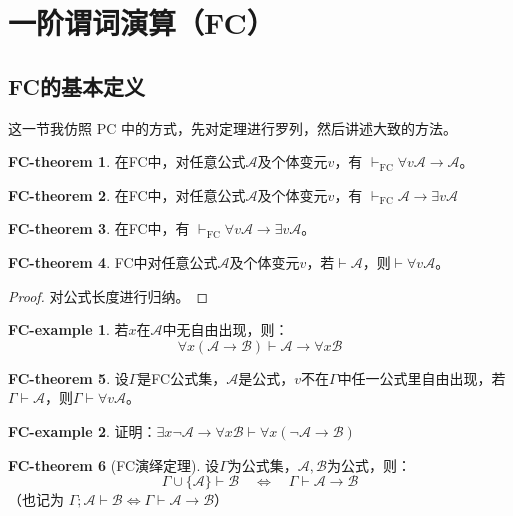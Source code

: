 \documentclass[oneside]{book}
\theoremstyle{definition}
\newtheorem{fct}{FC-theorem}
\newtheorem{fce}{FC-example}
\begin{document}
\section{一阶谓词演算（FC）}




\subsection{FC的基本定义}
这一节我仿照 PC 中的方式，先对定理进行罗列，然后讲述大致的方法。
\begin{fct}
	在FC中，对任意公式\( \mathcal{A} \)及个体变元\( v \)，有 \( \vdash_{\text{FC}} \forall v \mathcal{A} \to \mathcal{A} \)。
\end{fct}
\begin{fct}
	在FC中，对任意公式\( \mathcal{A} \)及个体变元\( v \)，有 \( \vdash_{\text{FC}} \mathcal{A} \to \exists v \mathcal{A} \)
\end{fct}
\begin{fct}
	在FC中，有 \( \vdash_{\text{FC}} \forall v \mathcal{A} \to \exists v \mathcal{A} \)。
\end{fct}
\begin{fct}
	FC中对任意公式\( \mathcal{A} \)及个体变元\( v \)，若\( \vdash \mathcal{A} \)，则\( \vdash \forall v \mathcal{A} \)。
\end{fct}
\begin{proof}
	对公式长度进行归纳。
\end{proof}
\begin{fce}
若\( x \)在\( \mathcal{A} \)中无自由出现，则：
\[
\forall x (\mathcal{A} \to \mathcal{B}) \vdash \mathcal{A} \to \forall x \mathcal{B}
\]
\end{fce}
\begin{fct}
	设\( \Gamma \)是FC公式集，\( \mathcal{A} \)是公式，\( v \)不在\( \Gamma \)中任一公式里自由出现，若\( \Gamma \vdash \mathcal{A} \)，则\( \Gamma \vdash \forall v \mathcal{A} \)。
\end{fct}
\begin{fce}
	证明：\( \exists x \neg \mathcal{A} \to \forall x \mathcal{B} \vdash \forall x (\neg \mathcal{A} \to \mathcal{B}) \)
\end{fce}

\begin{fct}[FC演绎定理]
	设\( \Gamma \)为公式集，\( \mathcal{A}, \mathcal{B} \)为公式，则：
	\[
	\Gamma \cup \{ \mathcal{A} \} \vdash \mathcal{B} \quad \iff \quad \Gamma \vdash \mathcal{A} \to \mathcal{B}
	\]
	（也记为 \( \Gamma; \mathcal{A} \vdash \mathcal{B} \iff \Gamma \vdash \mathcal{A} \to \mathcal{B} \)）
\end{fct}
\end{document}
